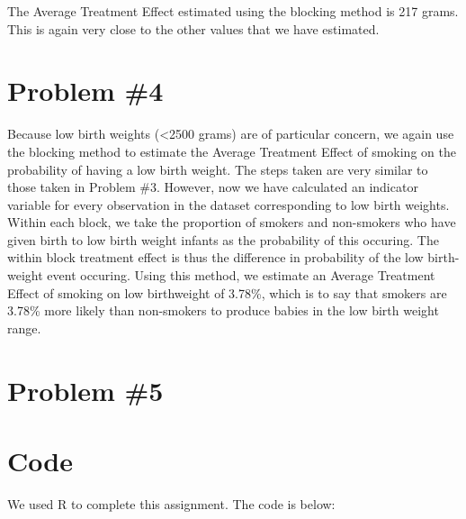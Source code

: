 \documentclass[letterpaper, 12pt]{article}
\begin{document}
The Average Treatment Effect estimated using the blocking method is 217 grams. This is again very close to the other values that we have estimated.

\section{Problem \#4}
Because low birth weights (<2500 grams) are of particular concern, we again use the blocking method to estimate the Average Treatment Effect of smoking on the probability of having a low birth weight. The steps taken are very similar to those taken in Problem \#3. However, now we have calculated an indicator variable for every observation in the dataset corresponding to low birth weights. Within each block, we take the proportion of smokers and non-smokers who have given birth to low birth weight infants as the probability of this occuring. The within block treatment effect is thus the difference in probability of the low birth-weight event occuring. Using this method, we estimate an Average Treatment Effect of smoking on low birthweight of 3.78\%, which is to say that smokers are 3.78\% more likely than non-smokers to produce babies in the low birth weight range.

\section{Problem \#5}



\section{Code}
We used R to complete this assignment.  The code is below:




\newpage
\thispagestyle{empty}
\mbox{}
\end{document}
